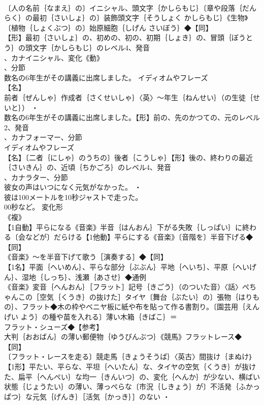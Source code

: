 \documentclass[8pt]{extreport}
\begin{document}
\begin{CJK}{UTF8}{min}
\\	〔人の名前｛なまえ｝の〕イニシャル、頭文字｛かしらもじ｝〔章や段落｛だんらく｝の最初｛さいしょ｝の〕装飾頭文字｛そうしょく かしらもじ｝《生物》〔植物｛しょくぶつ｝の〕始原細胞｛しげん さいぼう｝◆【同】
\\	【形】最初｛さいしょ｝の、初めの、初の、初期｛しょき｝の、冒頭｛ぼうとう｝の頭文字｛かしらもじ｝のレベル4、発音
\\	、カナイニシャル、変化《動》
\\	、分節
\\	数名の6年生がその講義に出席しました。	イディオムやフレーズ 
\\	【名】
\\	前者｛ぜんしゃ｝作成者｛さくせいしゃ｝〈英〉～年生｛ねんせい｝（の生徒｛せいと｝） ・
\\	数名の6年生がその講義に出席しました。【形】前の、先のかつての、元のレベル2、発音
\\	、カナフォーマー、分節
\\	イディオムやフレーズ 
\\	【名】〔二者｛にしゃ｝のうちの〕後者｛こうしゃ｝【形】後の、終わりの最近｛さいきん｝の、近頃｛ちかごろ｝のレベル4、発音
\\	、カナラター、分節
\\	彼女の声はいつになく元気がなかった。 ・
\\	彼は100メートルを10秒ジャストで走った。
\\	00秒など。	変化形 
\\	《複》
\\	【1自動】平らになる《音楽》半音｛はんおん｝下がる失敗｛しっぱい｝に終わる〔会などが〕だらける【1他動】平らにする《音楽》〔音階を〕半音下げる◆【同】
\\	《音楽》～を半音下げて歌う［演奏する］◆【同】
\\	【1名】平面｛へいめん｝、平らな部分｛ぶぶん｝平地｛へいち｝、平原｛へいげん｝、湿地｛しっち｝、浅瀬｛あさせ｝◆通例
\\	《音楽》変音｛へんおん｝［フラット］記号｛きごう｝（のついた音）〈話〉ぺちゃんこの［空気｛くうき｝の抜けた］タイヤ〔舞台｛ぶたい｝の〕張物｛はりもの｝、フラット◆木の枠やベニヤ板に紙や布を貼って作る書割り。〔園芸用｛えんげい よう｝の種や苗を入れる〕薄い木箱｛きばこ｝＝ 
\\	フラット・シューズ◆【参考】
\\	大判｛おおばん｝の薄い郵便物｛ゆうびんぶつ｝《競馬》フラットレース◆【同】
\\	〔フラット・レースを走る〕競走馬｛きょうそうば｝〈英古〉間抜け｛まぬけ｝【1形】平たい、平らな、平坦｛へいたん｝な、タイヤの空気｛くうき｝が抜けた、扁平｛へんぺい｝な均一｛きんいつ｝の、変化｛へんか｝が少ない、横ばい状態｛じょうたい｝の薄い、薄っぺらな〔市況｛しきょう｝が〕不活発｛ふかっぱつ｝な元気｛げんき｝［活気｛かっき｝］のない ・

\end{CJK}
\end{document}
